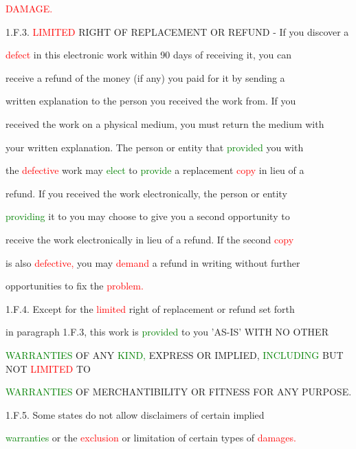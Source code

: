  \textcolor{red}{DAMAGE.}



 1.F.3. \textcolor{red}{LIMITED} RIGHT OF REPLACEMENT OR REFUND - If you discover a

 \textcolor{red}{defect} in this electronic work within 90 days of receiving it, you can

 receive a refund of the \textcolor{BurntOrange}{money} (if any) you paid for it by sending a

 written explanation to the person you received the work from. If you

 received the work on a physical medium, you must return the medium with

 your written explanation. The person or entity that \textcolor{green}{provided} you with

 the \textcolor{red}{defective} work may \textcolor{green}{elect} to \textcolor{green}{provide} a replacement \textcolor{red}{copy} in lieu of a

 refund. If you received the work electronically, the person or entity

 \textcolor{green}{providing} it to you may choose to give you a second \textcolor{BurntOrange}{opportunity} to

 receive the work electronically in lieu of a refund. If the second \textcolor{red}{copy}

 is also \textcolor{red}{defective,} you may \textcolor{red}{demand} a refund in writing without further

 \textcolor{BurntOrange}{opportunities} to fix the \textcolor{red}{problem.}



 1.F.4. Except for the \textcolor{red}{limited} right of replacement or refund set forth

 in paragraph 1.F.3, this work is \textcolor{green}{provided} to you 'AS-IS' WITH NO OTHER

 \textcolor{green}{WARRANTIES} OF ANY \textcolor{green}{KIND,} EXPRESS OR IMPLIED, \textcolor{green}{INCLUDING} BUT NOT \textcolor{red}{LIMITED} TO

 \textcolor{green}{WARRANTIES} OF MERCHANTIBILITY OR FITNESS FOR ANY PURPOSE.



 1.F.5. Some states do not allow disclaimers of certain implied

 \textcolor{green}{warranties} or the \textcolor{red}{exclusion} or limitation of certain types of \textcolor{red}{damages.}

